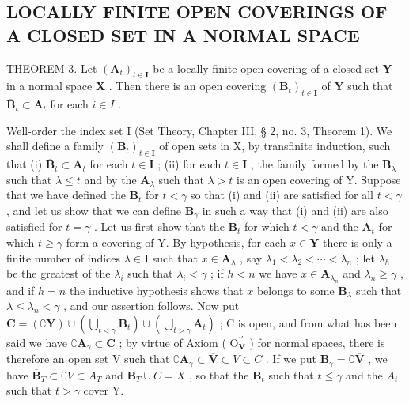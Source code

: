 \subsection{LOCALLY FINITE OPEN COVERINGS OF A CLOSED SET IN A NORMAL SPACE}

THEOREM 3. Let \((\mathbf{A}_t)_{t\in \mathbf{I}}\) be a locally finite open covering of a closed set \(\mathbf{Y}\) in a normal space \(\mathbf{X}\) . Then there is an open covering \((\mathbf{B}_t)_{t\in \mathbf{I}}\) of \(\mathbf{Y}\) such that \(\overline{\mathbf{B}}_t\subset \mathbf{A}_t\) for each \(i\in I\) .

Well-order the index set I (Set Theory, Chapter III, § 2, no. 3, Theorem 1). We shall define a family \((\mathbf{B}_t)_{t \in \mathbf{I}}\) of open sets in X, by transfinite induction, such that (i) \(\overline{\mathbf{B}}_t \subset \mathbf{A}_t\) for each \(t \in \mathbf{I}\) ; (ii) for each \(t \in \mathbf{I}\) , the family formed by the \(\mathbf{B}_\lambda\) such that \(\lambda \leqslant t\) and by the \(\mathbf{A}_\lambda\) such that \(\lambda > t\) is an open covering of Y. Suppose that we have defined the \(\mathbf{B}_t\) for \(t < \gamma\) so that (i) and (ii) are satisfied for all \(t < \gamma\) , and let us show that we can define \(\mathbf{B}_\gamma\) in such a way that (i) and (ii) are also satisfied for \(t = \gamma\) . Let us first show that the \(\mathbf{B}_t\) for which \(t < \gamma\) and the \(\mathbf{A}_t\) for which \(t \geqslant \gamma\) form a covering of Y. By hypothesis, for each \(x \in \mathbf{Y}\) there is only a finite number of indices \(\lambda \in \mathbf{I}\) such that \(x \in \mathbf{A}_\lambda\) , say \(\lambda_1 < \lambda_2 < \cdots < \lambda_n\) ; let \(\lambda_h\) be the greatest of the \(\lambda_i\) such that \(\lambda_i < \gamma\) ; if \(h < n\) we have \(x \in \mathbf{A}_{\lambda_n}\) and \(\lambda_n \geqslant \gamma\) , and if \(h = n\) the inductive hypothesis shows that \(x\) belongs to some \(\mathbf{B}_\lambda\) such that \(\lambda \leqslant \lambda_n < \gamma\) , and our assertion follows. Now put \(\mathbf{C} = (\complement\mathbf{Y}) \cup (\bigcup_{t < \gamma} \mathbf{B}_t) \cup (\bigcup_{t > \gamma} \mathbf{A}_t)\) ; C is open, and from what has been said we have \(\complement\mathbf{A}_\gamma \subset \mathbf{C}\) ; by virtue of Axiom ( \(\mathrm{O}_{\mathbf{V}}^{\prime\prime}\) ) for normal spaces, there is therefore an open set V such that \(\complement\mathbf{A}_\gamma \subset \overline{\mathbf{V}} \subset V \subset C\) . If we put \(\mathbf{B}_\gamma = \complement\overline{\mathbf{V}}\) , we have \(\overline{\mathbf{B}}_T \subset \complement V \subset A_T\) and \(\mathbf{B}_T \cup C = X\) , so that the \(\mathbf{B}_t\) such that \(t \leqslant \gamma\) and the \(A_t\) such that \(t > \gamma\) cover Y.

